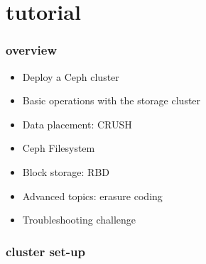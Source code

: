 \documentclass[10pt, compress]{beamer}
\begin{document}
\section{tutorial}
\begin{frame}[fragile]
    \frametitle{overview}
    \begin{itemize}
        \item Deploy a Ceph cluster
        \item Basic operations with the storage cluster
        \item Data placement: CRUSH
        \item Ceph Filesystem
        \item Block storage: RBD
        \item Advanced topics: erasure coding
        \item Troubleshooting challenge
    \end{itemize}
\end{frame}

\begin{frame}[fragile]
    \frametitle{cluster set-up}
    \begin{center}
        
    \end{center}
\end{frame}

\end{document}
